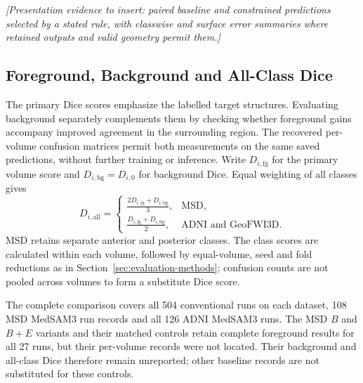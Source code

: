 \documentclass[12pt,a4paper]{article}
\begin{document}
\noindent\textit{[Presentation evidence to insert: paired baseline and
constrained predictions selected by a stated rule, with classwise and
surface error summaries where retained outputs and valid geometry permit them.]}

\FloatBarrier
\FloatBarrier
\subsection{Foreground, Background and All-Class Dice}
\label{sec:background-dice-results}

The primary Dice scores emphasize the labelled target structures.
Evaluating background separately complements them by checking whether
foreground gains accompany improved agreement in the surrounding region.
The recovered per-volume confusion matrices permit both measurements
on the same saved predictions, without further training or inference.
Write $D_{i,\mathrm{fg}}$ for the primary volume score and
$D_{i,\mathrm{bg}}=D_{i,0}$ for background Dice. Equal weighting of
all classes gives
\begin{equation}
D_{i,\mathrm{all}}=
\begin{cases}
\displaystyle\frac{2D_{i,\mathrm{fg}}+D_{i,\mathrm{bg}}}{3},
 & \text{MSD},\\[.6em]
\displaystyle\frac{D_{i,\mathrm{fg}}+D_{i,\mathrm{bg}}}{2},
 & \text{ADNI and GeoFWI3D}.
\end{cases}
\label{eq:reported-all-class-dice}
\end{equation}
MSD retains separate anterior and posterior classes. The class scores
are calculated within each volume, followed by equal-volume, seed and
fold reductions as in Section~\ref{sec:evaluation-methods}; confusion
counts are not pooled across volumes to form a substitute Dice score.

The complete comparison covers all 504 conventional runs on each
dataset, 108 MSD MedSAM3 run records and all 126 ADNI MedSAM3 runs.
The MSD $B$ and $B+E$ variants and their matched controls retain complete
foreground results for all 27 runs, but their per-volume records were
not located. Their background and all-class Dice therefore remain
unreported; other baseline records are not substituted for these controls.
\end{document}
